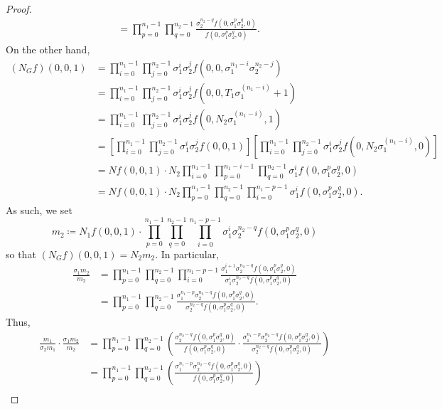 \documentclass{article}
\begin{document}
\begin{proof}
\begin{align*}
		&= \prod_{p=0}^{n_1-1}\prod_{q=0}^{n_2-1}\frac{\sigma_2^{n_2-q}f\left(0,\sigma_1^p\sigma_2^q,0\right)}{f\left(0,\sigma_1^p\sigma_2^q,0\right)}.
	\end{align*}
	On the other hand,
	\begin{align*}
		(N_Gf)(0,0,1) &= \prod_{i=0}^{n_1-1}\prod_{j=0}^{n_2-1}\sigma_1^i\sigma_2^jf\left(0,0,\sigma_1^{n_1-i}\sigma_2^{n_2-j}\right) \\
		&= \prod_{i=0}^{n_1-1}\prod_{j=0}^{n_2-1}\sigma_1^i\sigma_2^jf\left(0,0,T_1\sigma_1^{(n_1-i)}+1\right) \\
		&= \prod_{i=0}^{n_1-1}\prod_{j=0}^{n_2-1}\sigma_1^i\sigma_2^jf\left(0,N_2\sigma_1^{(n_1-i)},1\right) \\
		&= \left[\prod_{i=0}^{n_1-1}\prod_{j=0}^{n_2-1}\sigma_1^i\sigma_2^jf\left(0,0,1\right)\right]\left[\prod_{i=0}^{n_1-1}\prod_{j=0}^{n_2-1}\sigma_1^i\sigma_2^jf\left(0,N_2\sigma_1^{(n_1-i)},0\right)\right] \\
		&= Nf(0,0,1)\cdot N_2\prod_{i=0}^{n_1-1}\prod_{p=0}^{n_1-i-1}\prod_{q=0}^{n_2-1}\sigma_1^if\left(0,\sigma_1^p\sigma_2^q,0\right) \\
		&= Nf(0,0,1)\cdot N_2\prod_{p=0}^{n_1-1}\prod_{q=0}^{n_2-1}\prod_{i=0}^{n_1-p-1}\sigma_1^if\left(0,\sigma_1^p\sigma_2^q,0\right).
	\end{align*}
	As such, we set
	\[m_2\coloneqq N_1f(0,0,1)\cdot\prod_{p=0}^{n_1-1}\prod_{q=0}^{n_2-1}\prod_{i=0}^{n_1-p-1}\sigma_1^i\sigma_2^{n_2-q}f\left(0,\sigma_1^p\sigma_2^q,0\right)\]
	so that $(N_Gf)(0,0,1)=N_2m_2$. In particular,
	\begin{align*}
		\frac{\sigma_1m_2}{m_2} &= \prod_{p=0}^{n_1-1}\prod_{q=0}^{n_2-1}\prod_{i=0}^{n_1-p-1}\frac{\sigma_1^{i+1}\sigma_2^{n_2-q}f\left(0,\sigma_1^p\sigma_2^q,0\right)}{\sigma_1^i\sigma_2^{n_2-q}f\left(0,\sigma_1^p\sigma_2^q,0\right)} \\
		&= \prod_{p=0}^{n_1-1}\prod_{q=0}^{n_2-1}\frac{\sigma_1^{n_1-p}\sigma_2^{n_2-q}f\left(0,\sigma_1^p\sigma_2^q,0\right)}{\sigma_2^{n_2-q}f\left(0,\sigma_1^p\sigma_2^q,0\right)}.
	\end{align*}
	Thus,
	\begin{align*}
		\frac{m_1}{\sigma_2m_1}\cdot\frac{\sigma_1m_2}{m_2} &= \prod_{p=0}^{n_1-1}\prod_{q=0}^{n_2-1}\left(\frac{\sigma_2^{n_2-q}f\left(0,\sigma_1^p\sigma_2^q,0\right)}{f\left(0,\sigma_1^p\sigma_2^q,0\right)}\cdot\frac{\sigma_1^{n_1-p}\sigma_2^{n_2-q}f\left(0,\sigma_1^p\sigma_2^q,0\right)}{\sigma_2^{n_2-q}f\left(0,\sigma_1^p\sigma_2^q,0\right)}\right) \\
		&= \prod_{p=0}^{n_1-1}\prod_{q=0}^{n_2-1}\left(\frac{\sigma_1^{n_1-p}\sigma_2^{n_2-q}f\left(0,\sigma_1^p\sigma_2^q,0\right)}{f\left(0,\sigma_1^p\sigma_2^q,0\right)}\right) \\

\end{align*}
\end{proof}
\end{document}
